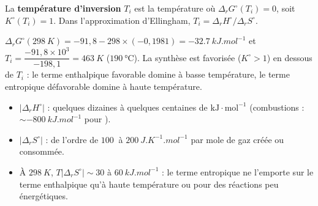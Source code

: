 \begin{definition}
La \textbf{température d'inversion} $T_i$ est la température où $\Delta_rG^\circ(T_i) = 0$, soit $K^\circ(T_i) = 1$. Dans l'approximation d'Ellingham, $T_i = \Delta_rH^\circ/\Delta_rS^\circ$.
\end{definition}

\begin{exemple}
$\Delta_rG^\circ(\SI{298}{K}) = -91{,}8 - 298\times(-0{,}1981) = \SI{-32,7}{kJ.mol^{-1}}$ et $T_i = \dfrac{-91{,}8\times10^3}{-198{,}1} = \SI{463}{K}$ ($\SI{190}{\celsius}$). La synthèse est favorisée ($K^\circ > 1$) en dessous de $T_i$ : le terme enthalpique favorable domine à basse température, le terme entropique défavorable domine à haute température.
\end{exemple}

\begin{ordres}
\begin{itemize}
  \item $|\Delta_rH^\circ|$ : quelques dizaines à quelques centaines de $\mathrm{kJ\cdot mol^{-1}}$ (combustions : $\sim\SI{-800}{kJ.mol^{-1}}$ pour ).
  \item $|\Delta_rS^\circ|$ : de l'ordre de $\SI{100}{}$ à $\SI{200}{J.K^{-1}.mol^{-1}}$ par mole de gaz créée ou consommée.
  \item À $\SI{298}{K}$, $T|\Delta_rS^\circ| \sim 30$ à $\SI{60}{kJ.mol^{-1}}$ : le terme entropique ne l'emporte sur le terme enthalpique qu'à haute température ou pour des réactions peu énergétiques.
\end{itemize}
\end{ordres}
